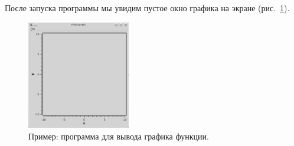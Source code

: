 После запуска программы мы увидим пустое окно графика на экране (рис.~\ref{ch15:refDrawing12}).
\begin{figure}[htb]
\begin{center}
\includegraphics[width=0.4\textwidth]{img/ris_15_13}
\caption[Пример: программа для вывода графика функции.]{Пример: программа для вывода графика функции.}
\label{ch15:refDrawing12}
\end{center}
\end{figure}

